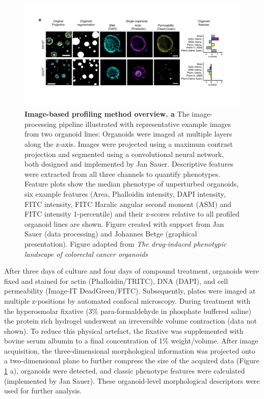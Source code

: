 \begin{flushleft}
\begin{figure}[h]
\centering
\includegraphics[width=\textwidth,
                height=\textheight,
                keepaspectratio]{figures/promise/pdf/fig_1_2.pdf}
\caption[Image-based profiling method overview]{\textbf{Image-based profiling method overview. a} The image-processing pipeline illustrated with representative example images from two organoid lines: Organoids were imaged at multiple layers along the z-axis. Images were projected using a maximum contrast projection and segmented using a convolutional neural network, both designed and implemented by Jan Sauer. Descriptive features were extracted from all three channels to quantify phenotypes. Feature plots show the median phenotype of unperturbed organoids, six example features (Area, Phalloidin intensity, DAPI intensity, FITC intensity, FITC Haralic angular second moment (ASM) and FITC intensity 1-percentile) and their z-scores relative to all profiled organoid lines are shown. Figure created with support from Jan Sauer (data processing) and Johannes Betge (graphical presentation). Figure adapted from \textit{The drug-induced phenotypic landscape of colorectal cancer organoids} \parencite{betgeDruginducedPhenotypicLandscape2022}}
\label{fig_135}
\end{figure}

After three days of culture and four days of compound treatment, organoids were fixed and stained for actin (Phalloidin/TRITC), DNA (DAPI), and cell permeability (Image-IT DeadGreen/FITC). Subsequently, plates were imaged at multiple z-positions by automated confocal microscopy. During treatment with the hyperosmolar fixative (3\% para-formaldehyde in phosphate buffered saline) the protein rich hydrogel underwent an irreversible volume contraction (data not shown). To reduce this physical artefact, the fixative was supplemented with bovine serum albumin to a final concentration of 1\% weight/volume. After image acquisition, the three-dimensional morphological information was projected onto a two-dimensional plane to further compress the size of the acquired data (Figure \ref{fig_135} a), organoids were detected, and classic phenotype features were calculated (implemented by Jan Sauer). These organoid-level morphological descriptors were used for further analysis.  


\end{flushleft}
